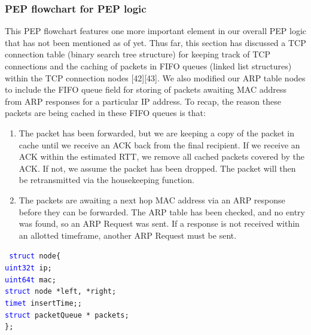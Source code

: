 \documentclass{uathesis}
\begin{document}
\subsubsection{PEP flowchart for PEP logic}
This PEP flowchart features one more important element in our overall PEP logic that has not been mentioned as of yet. Thus far, this section has discussed a TCP connection table (binary search tree structure) for keeping track of TCP connections and the caching of packets in FIFO queues (linked list structures) within the TCP connection nodes [42][43]. We also modified our ARP table nodes to include the FIFO queue field for storing of packets awaiting MAC address from ARP responses for a particular IP address. To recap, the reason these packets are being cached in these FIFO queues is that: \\
\begin{enumerate}

\item The packet has been forwarded, but we are keeping a copy of the packet in cache until we receive an ACK back from the final recipient. If we receive an ACK within the estimated RTT, we remove all cached packets covered by the ACK. If not, we assume the packet has been dropped. The packet will then be retransmitted via the housekeeping function. \\
\item The packets are awaiting a next hop MAC address via an ARP response before they can be forwarded. The ARP table has been checked, and no entry was found, so an ARP Request was sent. If a response is not received within an allotted timeframe, another ARP Request must be sent. \\

\end{enumerate}

{\tt
\noindent \textcolor{blue}{struct} node\big\{\\
\hphantom{structarp} \textcolor{blue}{uint32\textunderscore t}\hphantom{htyi} ip;\\
\hphantom{structarp} \textcolor{blue}{uint64\textunderscore t} \hphantom{hty} mac;\\
\hphantom{structarp} \textcolor{blue}{struct}\hphantom{htynod} node *left, *right;\\
\hphantom{structarp} \textcolor{blue}{time\textunderscore t}\hphantom{htynod} insertTime;;\\
\hphantom{structarp} \textcolor{blue}{struct}\hphantom{htynod} packetQueue * packets; \\
\indent\big\};}\\
\end{document}
